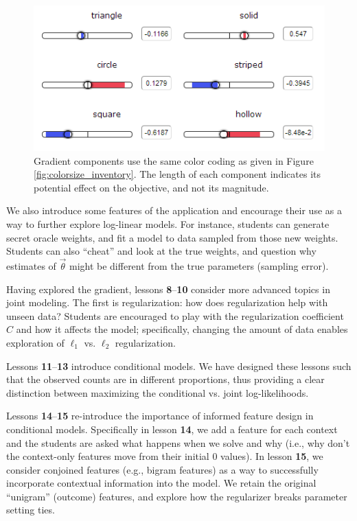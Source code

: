 \documentclass[11pt,letterpaper]{article}
\begin{document}
\begin{figure}[t]
\centering
\small
\includegraphics[scale=.65]{images/gradient-lesson7.PNG}
\caption{Gradient components use the same color coding as given in Figure \ref{fig:colorsize_inventory}. The length of each component indicates its potential effect on the objective, and not its magnitude.}
\label{fig:gradients}
\end{figure}

We also introduce some features of the application and encourage their use as a way to 
further explore log-linear models. For instance, students can generate secret oracle weights, and 
fit a model to data sampled from those new weights. Students can also ``cheat'' and look at the true 
weights,  and question why estimates of $\vec{\theta}$ might be different from the true parameters 
(sampling error).

Having explored the gradient, lessons \textbf{8}--\textbf{10} consider more advanced topics in joint 
modeling. The first is regularization: how does regularization help with unseen data? Students are encouraged 
to play with the regularization coefficient $C$ and how it affects the model; specifically, changing the amount 
of data enables exploration of $\ell_1$ vs. $\ell_2$ regularization.

Lessons \textbf{11}--\textbf{13} introduce conditional models. We have designed these lessons such that the 
observed counts are in different proportions, thus providing a clear distinction between maximizing the conditional 
vs. joint log-likelihoods.

Lessons \textbf{14}--\textbf{15} re-introduce the importance of informed feature design in conditional models. 
Specifically in lesson \textbf{14}, we add a feature for each context and the students are asked what happens 
when we solve and why (i.e., why don't the context-only features move from their initial 0 values). 
In lesson \textbf{15}, we consider conjoined features (e.g., bigram features) as a way to successfully incorporate 
contextual information into the model. We retain the original ``unigram'' (outcome) features, and explore
how the regularizer breaks parameter setting ties.
\end{document}
